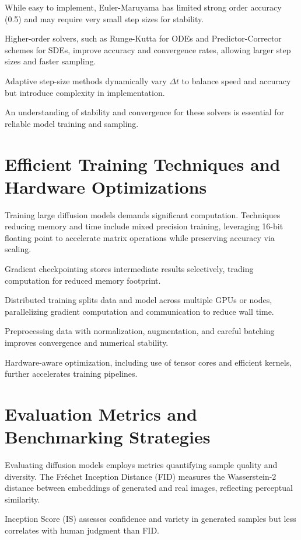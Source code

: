 \documentclass[a4paper,12pt,oneside]{memoir}
\begin{document}
While easy to implement, Euler-Maruyama has limited strong order accuracy (0.5) and may require very small step sizes for stability.

Higher-order solvers, such as Runge-Kutta for ODEs and Predictor-Corrector schemes for SDEs, improve accuracy and convergence rates, allowing larger step sizes and faster sampling.

Adaptive step-size methods dynamically vary \( \Delta t \) to balance speed and accuracy but introduce complexity in implementation.

An understanding of stability and convergence for these solvers is essential for reliable model training and sampling.

\section{Efficient Training Techniques and Hardware Optimizations}

Training large diffusion models demands significant computation. Techniques reducing memory and time include mixed precision training, leveraging 16-bit floating point to accelerate matrix operations while preserving accuracy via scaling.

Gradient checkpointing stores intermediate results selectively, trading computation for reduced memory footprint.

Distributed training splits data and model across multiple GPUs or nodes, parallelizing gradient computation and communication to reduce wall time.

Preprocessing data with normalization, augmentation, and careful batching improves convergence and numerical stability.

Hardware-aware optimization, including use of tensor cores and efficient kernels, further accelerates training pipelines.

\section{Evaluation Metrics and Benchmarking Strategies}

Evaluating diffusion models employs metrics quantifying sample quality and diversity. The Fréchet Inception Distance (FID) measures the Wasserstein-2 distance between embeddings of generated and real images, reflecting perceptual similarity.

Inception Score (IS) assesses confidence and variety in generated samples but less correlates with human judgment than FID.
\end{document}
